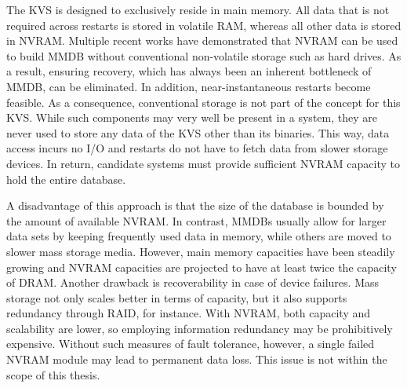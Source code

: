 The \ac{KVS} is designed to exclusively reside in main memory. All data that is
not required across restarts is stored in volatile \ac{RAM}, whereas all other
data is stored in \ac{NVRAM}. Multiple recent works have demonstrated that
\ac{NVRAM} can be used to build \ac{MMDB} without conventional non-volatile
storage such as hard drives. As a result, ensuring recovery, which has always
been an inherent bottleneck of \ac{MMDB}, can be eliminated. In addition,
near-instantaneous restarts become feasible. As a consequence, conventional
storage is not part of the concept for this \ac{KVS}. While such components may
very well be present in a system, they are never used to store any data of the
\ac{KVS} other than its binaries. This way, data access incurs no I/O and
restarts do not have to fetch data from slower storage devices. In return,
candidate systems must provide sufficient \ac{NVRAM} capacity to hold the entire
database.

A disadvantage of this approach is that the size of the database is bounded by
the amount of available \ac{NVRAM}. In contrast, \acp{MMDB} usually allow for
larger data sets by keeping frequently used data in memory, while others are
moved to slower mass storage media. However, main memory capacities have been
steadily growing and \ac{NVRAM} capacities are projected to have at least twice
the capacity of \ac{DRAM}. Another drawback is recoverability in case of device
failures. Mass storage not only scales better in terms of capacity, but it also
supports redundancy through \ac{RAID}, for instance. With \ac{NVRAM}, both
capacity and scalability are lower, so employing information redundancy may be
prohibitively expensive. Without such measures of fault tolerance, however, a
single failed \ac{NVRAM} module may lead to permanent data loss. This issue is
not within the scope of this thesis.

\vfill

